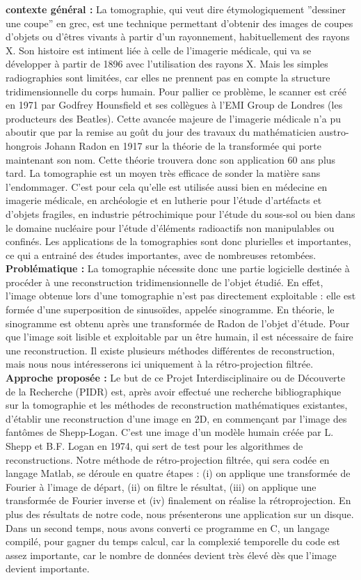 \documentclass[conference]{IEEEtran}
\begin{document}
\textbf{contexte général :}
La tomographie, qui veut dire étymologiquement ”dessiner une coupe” en grec, est une technique permettant d’obtenir des images de coupes d’objets ou d’êtres vivants à partir d'un rayonnement, habituellement des rayons X. Son histoire est intiment liée à celle de l’imagerie médicale, qui va se développer à partir de 1896 avec l’utilisation des rayons X. Mais les simples radiographies sont limitées, car elles ne prennent pas en compte la structure tridimensionnelle du corps humain. Pour pallier ce problème, le scanner est créé en 1971 par Godfrey Hounsfield et ses collègues à l’EMI Group de Londres (les producteurs des Beatles). Cette avancée majeure de l’imagerie médicale n’a pu aboutir que par la remise au goût du jour des travaux du mathématicien austro-hongrois Johann Radon en 1917 sur la théorie de la transformée qui porte maintenant son nom. Cette théorie trouvera donc son application 60 ans plus tard.
La tomographie est un moyen très efficace de sonder la matière sans l’endommager. C’est pour cela qu’elle est utilisée aussi bien en médecine en imagerie médicale, en archéologie et en lutherie pour l’étude d’artéfacts et d’objets fragiles, en industrie pétrochimique pour l’étude du sous-sol ou bien dans le domaine nucléaire pour l’étude d’éléments radioactifs non manipulables ou confinés. Les applications de la tomographies sont donc plurielles et importantes, ce qui a entrainé des études importantes, avec de nombreuses retombées.
\textbf{Problématique :}
La tomographie nécessite donc une partie logicielle destinée à procéder à une reconstruction tridimensionnelle de l’objet étudié. En effet, l’image obtenue lors d’une tomographie n’est pas directement exploitable : elle est formée d’une superposition de sinusoïdes, appelée sinogramme. En théorie, le sinogramme est obtenu après une transformée de Radon de l’objet d’étude. Pour que l’image soit lisible et exploitable par un être humain, il est nécessaire de faire une reconstruction. Il existe plusieurs méthodes différentes de reconstruction, mais nous nous intéresserons ici uniquement à la rétro-projection filtrée.
\textbf{Approche proposée :}
Le but de ce Projet Interdisciplinaire ou de Découverte de la Recherche (PIDR) est, après avoir effectué une recherche bibliographique sur la tomographie et les méthodes de reconstruction mathématiques existantes,  d’établir une reconstruction d’une image en 2D, en commençant par l’image des fantômes de Shepp-Logan. C’est une image d’un modèle humain créée par L. Shepp et B.F. Logan en 1974, qui sert de test pour les algorithmes de reconstructions. Notre méthode de rétro-projection filtrée, qui sera codée en langage Matlab, se déroule en quatre étapes : (i) on applique une transformée de Fourier à l’image de départ, (ii)  on filtre le résultat, (iii) on applique une transformée de Fourier inverse et (iv) finalement on réalise la rétroprojection. En plus des résultats de notre code, nous présenterons une application sur un disque. Dans un second temps, nous avons converti ce programme en C, un langage compilé, pour gagner du temps calcul, car la complexié temporelle du code est assez importante, car le nombre de données devient très élevé dès que l’image devient importante.
\end{document}

